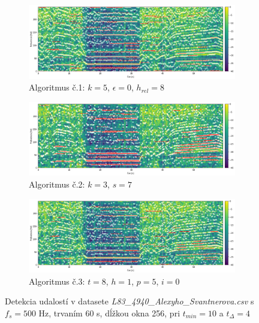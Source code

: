 \begin{figure}[h]
	\centering
     \begin{subfigure}{\textwidth}
        \centering
     	\includegraphics[width=\textwidth]{figures/verification/L83-dataset-A1.png}
     	\caption{Algoritmus č.1: $k = 5$, $\epsilon = 0$, $h_{rel} = 8$}
     \end{subfigure}
     \begin{subfigure}{\textwidth}
    	\centering
        \includegraphics[width=\textwidth]{figures/verification/L83-dataset-A2.png}
        \caption{Algoritmus č.2: $k = 3$, $s = 7$}
     \end{subfigure}
      \begin{subfigure}{\textwidth}
    	\centering
        \includegraphics[width=\textwidth]{figures/verification/L83-dataset-A3.png}
        \caption{Algoritmus č.3: $t = 8$, $h = 1$, $p = 5$, $i = 0$}
     \end{subfigure}
     \caption{Detekcia udalostí v datasete \emph{L83\_4940\_Alexyho\_Svantnerova.csv} s $f_s = 500$ Hz, trvaním 60 s, dĺžkou okna 256,
     pri $t_{min} = 10$ a $t_{\Delta} = 4$}
     \label{dataset-detection}
\end{figure}
